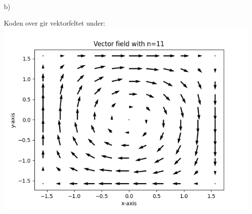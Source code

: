 \documentclass[12pt, a4paper]{article}
\begin{document}
b)

Koden over gir vektorfeltet under: \\
\hspace*{-1.5cm}
\includegraphics[scale=1]{vec_11.png}
\end{document}
